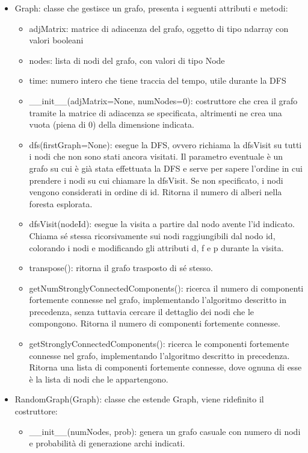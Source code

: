 \documentclass[]{article}
\begin{document}
\begin{itemize}
\item Graph: classe che gestisce un grafo, presenta i seguenti attributi e metodi:
\begin{itemize}
\item adjMatrix: matrice di adiacenza del grafo, oggetto di tipo ndarray con valori booleani
\item nodes: lista di nodi del grafo, con valori di tipo Node
\item time: numero intero che tiene traccia del tempo, utile durante la DFS
\item \_\_init\_\_(adjMatrix=None, numNodes=0): costruttore che crea il grafo tramite la matrice di adiacenza se specificata, altrimenti ne crea una vuota (piena di 0) della dimensione indicata.
\item dfs(firstGraph=None): esegue la DFS, ovvero richiama la dfsVisit su tutti i nodi che non sono stati ancora visitati. Il parametro eventuale è un grafo su cui è già stata effettuata la DFS e serve per sapere l'ordine in cui prendere i nodi su cui chiamare la dfsVisit. Se non specificato, i nodi vengono considerati in ordine di id. Ritorna il numero di alberi nella foresta esplorata.
\item dfsVisit(nodeId): esegue la visita a partire dal nodo avente l'id indicato. Chiama sé stessa ricorsivamente sui nodi raggiungibili dal nodo id, colorando i nodi e modificando gli attributi d, f e p durante la visita.
\item transpose(): ritorna il grafo trasposto di sé stesso.
\item getNumStronglyConnectedComponents(): ricerca il numero di componenti fortemente connesse nel grafo, implementando l'algoritmo descritto in precedenza, senza tuttavia cercare il dettaglio dei nodi che le compongono. Ritorna il numero di componenti fortemente connesse.
\item getStronglyConnectedComponents(): ricerca le componenti fortemente connesse nel grafo, implementando l'algoritmo descritto in precedenza. Ritorna una lista di componenti fortemente connesse, dove ognuna di esse è la lista di nodi che le appartengono.
\end{itemize}

\item RandomGraph(Graph): classe che estende Graph, viene ridefinito il costruttore:
\begin{itemize}
\item \_\_init\_\_(numNodes, prob): genera un grafo casuale con numero di nodi e probabilità di generazione archi indicati.
\end{itemize}

\end{itemize}
\end{document}
